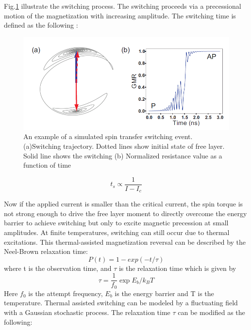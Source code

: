 Fig.\ref{fig:Switching} illustrate the switching process. The switching proceeds via a precessional motion of the magnetization with increasing amplitude\cite{subswitch}. The switching time is defined as the following :


\begin{figure}[!ht]
\centering
	\includegraphics[width=1.0\textwidth]{fig/switching.PNG}
	\caption{An example of a simulated spin transfer switching event.(a)Switching trajectory. Dotted lines show initial state of free layer. Solid line shows the switching (b) Normalized resistance value as a function of time}
	\label{fig:Switching}
\end{figure}

\begin{equation}
t_s \propto \frac{1}{I-I_c}
\end{equation}

Now if the applied current is smaller than the critical current, the spin torque is not strong enough to drive the free layer moment to directly overcome the energy barrier to achieve switching but only to excite magnetic precession at small amplitudes. At finite temperatures, switching can still occur due to thermal excitations. This thermal-assisted magnetization reversal can be described by the Neel-Brown relaxation time:
\begin{equation}
P(t) = 1 - exp(-t/\tau)
\end{equation}
where t is the observation time, and $\tau$ is the relaxation time which is given by
\begin{equation}
\tau = \frac{1}{f_0}\exp{E_b/k_B T}
\end{equation}
Here $f_0$ is the attempt frequency, $E_b$ is the energy barrier and T is the temperature. Thermal assisted switching can be modeled by a fluctuating field with a Gaussian stochastic process. The relaxation time $\tau$ can be modified as the following:

